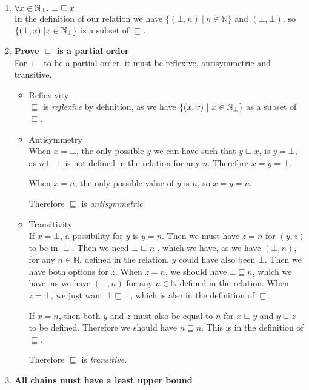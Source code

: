 \begin{enumerate}
\item{$\forall x \in \mathbb{N}_{\bot}. \ \bot \sqsubseteq x$ }\\
In the definition of our relation we have $\{ (\bot , n) \ | \ n \in \mathbb{N} \}$ and $(\bot , \bot)$. so $\{(\bot , x) \ | x \in \mathbb{N}_{\bot}\}$ is a subset of $\sqsubseteq$.
\item{\textbf{Prove $\sqsubseteq$ is a partial order}\\
For $\sqsubseteq$ to be a partial order, it must be reflexive, antisymmetric and transitive.
\begin{itemize}
\item{Reflexivity\\
$\sqsubseteq$ is \emph{reflexive} by definition, as we have $\{(x,x) \ | \ x \in \mathbb{N}_{\bot} \}$ as a subset of $\sqsubseteq$.}
\item{Antisymmetry\\
When $x = \bot$, the only possible $y$ we can have such that $y \sqsubseteq x$, is $y = \bot$, as  $n \sqsubseteq \bot$ is not defined in the relation for any $n$. Therefore $x = y = \bot$.

When $x = n$, the only possible value of $y$ is $n$, so $x = y = n$.

Therefore $\sqsubseteq$ is \emph{antisymmetric}}
\item{Transitivity \\
If $x = \bot$, a possibility for $y$ is $y =n$. Then we must have $z = n$ for $(y,z)$ to be in $\sqsubseteq$. Then we need $\bot \sqsubseteq n$ , which we have, as we have $(\bot, n)$, for any $n \in \mathbb{N}$, defined in the relation. $y$ could have also been $\bot$. Then we have both options for $z$. When $z = n$, we should have $\bot \sqsubseteq n$, which we have, as we have $(\bot, n)$ for any $n \in \mathbb{N}$ defined in the relation. When $z = \bot$, we just want $ \bot \sqsubseteq \bot$, which is also in the definition of $\sqsubseteq$.

If $x = n$, then both $y$ and $z$ must also be equal to $n$ for $x \sqsubseteq y$ and $y \sqsubseteq z$ to be defined. Therefore we should  have $n \sqsubseteq n$. This is in the definition of $\sqsubseteq$.

Therefore $\sqsubseteq$ is \emph{transitive}.}
\end{itemize}}

\item{\textbf{All chains must have a least upper bound}\\

}
\end{enumerate}
